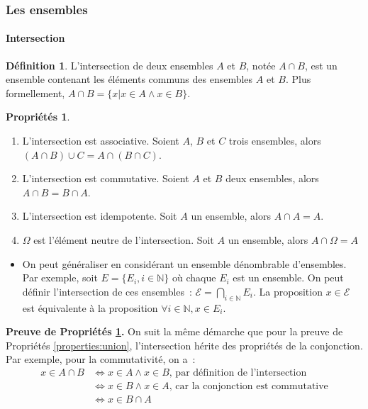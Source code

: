\documentclass[10pt,notheorems]{beamer}
\theoremstyle{plain}
\theoremstyle{definition} %
\newtheorem{definition}{Définition}
\newtheorem{properties}{Propriétés}
\begin{document}
\begin{frame}
  \frametitle{Les ensembles}
  \framesubtitle{Intersection}
  \hypertarget{slide_ensembles_intersection}{}

  \begin{definition}\label{def:intersection} L'intersection de deux ensembles $A$ et $B$, notée $A\cap B$, est un ensemble contenant les éléments communs des ensembles $A$ et $B$. Plus formellement, $A \cap B = \{x | x \in A \land x\in B\}$.
  \end{definition}

  \bigskip

  \begin{properties}\label{properties:intersection}
    \begin{enumerate}
    \item L'intersection est associative. Soient $A$, $B$ et $C$ trois ensembles, alors $(A\cap B)\cup C = A\cap (B\cap C)$.
    \item L'intersection est commutative. Soient $A$ et $B$ deux ensembles, alors $A \cap B = B \cap A$.
    \item L'intersection est idempotente. Soit $A$ un ensemble, alors $A \cap A = A$.
    \item $\Omega$ est l'élément neutre de l'intersection. Soit $A$ un ensemble, alors $A\cap\Omega=A$
    \end{enumerate}
  \end{properties}

\end{frame}


\begin{notes}
  \begin{itemize}
  \item On peut généraliser en considérant un ensemble dénombrable d'ensembles. Par exemple, soit $E = \{E_i, i\in \mathbb N\}$ où chaque $E_i$ est un ensemble. On peut définir l'intersection de ces ensembles~: $\mathcal E = \bigcap_{i\in\mathbb N}E_i$. La proposition  $x\in\mathcal E$ est équivalente à la proposition $\forall i\in\mathbb N, x\in E_i$.
  \end{itemize}

  \bigskip

  \textbf{Preuve de Propriétés \hyperlink{slide_ensembles_intersection}{\ref{properties:intersection}}.} On suit la même démarche que pour la preuve de Propriétés \hyperlink{slide_ensembles_union}{\ref{properties:union}}, l'intersection hérite des propriétés de la conjonction. Par exemple, pour la commutativité, on a :
  \[
    \begin{split}
      x \in A \cap B &\Leftrightarrow x \in A \land x\in B \text{, par définition de l'intersection}\\
      &\Leftrightarrow x \in B \land x\in A \text{, car la conjonction est commutative}\\
      &\Leftrightarrow x \in B\cap A
    \end{split}
  \]

\end{notes}
\end{document}
